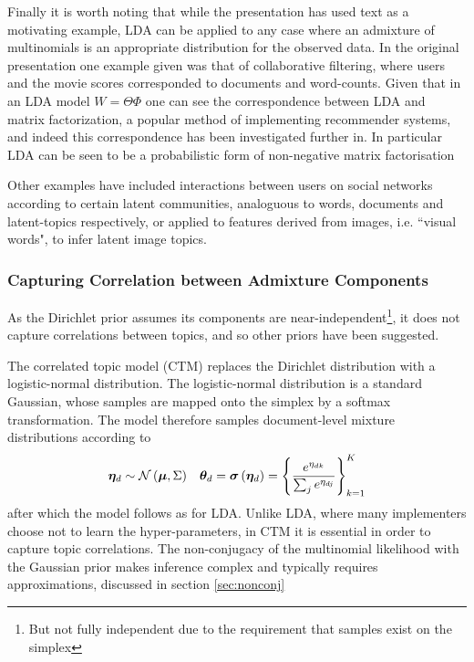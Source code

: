 Finally it is worth noting that while the presentation has used text as a motivating example, LDA can be applied to any case where an admixture of multinomials is an appropriate distribution for the observed data. In the original presentation\cite{BleiNgJordan2003} one example given was that of collaborative filtering, where users and the movie scores corresponded to documents and word-counts. Given that in an LDA model $W = \Theta \Phi$ one can see the correspondence between LDA and matrix factorization, a popular method of implementing recommender systems\cite{Salakhutdinov2007}, and indeed this correspondence has been investigated further in\cite{Agarwal2010}. In particular LDA can be seen to be a probabilistic form of non-negative matrix factorisation\cite{Lin2007}

Other examples have included interactions between users on social networks  according to certain latent communities, analoguous to words, documents and latent-topics respectively\cite{Zhang2007}, or applied to features derived from images, i.e. ``visual words", to infer latent image topics.\cite{Philbin2008}

\subsubsection{Capturing Correlation between Admixture Components}

As the Dirichlet prior assumes its components are near-independent\footnote{But not fully independent due to the requirement that samples exist on the simplex}, it does not capture correlations between topics, and so other priors have been suggested.

The correlated topic model\cite{Blei2006} (CTM) replaces the Dirichlet distribution with a logistic-normal distribution.  The logistic-normal distribution is a standard Gaussian, whose samples are mapped onto the simplex by a softmax transformation. The model therefore samples document-level mixture distributions according to
\begin{align}
\bm \eta_d & \sim \mathcal{N} \left( {\bm \mu}, {\Sigma} \right) & { \bm \theta_d } = \bm \sigma\left(\bm \eta_d\right) = \left\{\frac{e^{\eta_{dk}}}{\sum_j e^{\eta_{dj}}}\right\}_{k=1}^K
\end{align}
after which the model follows as for LDA. Unlike LDA, where many implementers choose not to learn the hyper-parameters, in CTM it is essential in order to capture topic correlations. The non-conjugacy of the multinomial likelihood with the Gaussian prior makes inference complex and typically requires approximations, discussed in section \ref{sec:nonconj}

